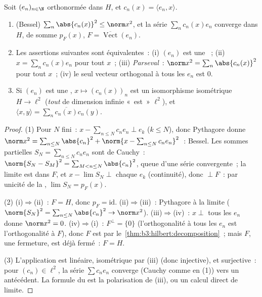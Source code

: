 \begin{theorem}\label{thm:b3:hilbert:parseval}
Soit $(e_n)_{n\in\N}$ orthonormée dans $H$, et $c_n(x) =
\langle e_n, x\rangle$.
\begin{enumerate}
  \item (Bessel) $\sum_n\abs{c_n(x)}^2 \leq \norm x^2$, et
        la série $\sum_nc_n(x)e_n$ converge dans $H$, de
        somme $p_F(x)$, $F = \overline{\operatorname{Vect}}(e_n)$.
  \item Les assertions suivantes sont équivalentes~: (i)
        $(e_n)$ est une ~; (ii) $x =
        \sum_nc_n(x)e_n$ pour tout $x$~; (iii)
        \emph{Parseval}~: $\norm
        x^2 = \sum_n\abs{c_n(x)}^2$ pour tout $x$~; (iv) le
        seul vecteur orthogonal à tous les $e_n$ est $0$.
  \item Si $(e_n)$ est une , $x \mapsto
        (c_n(x))_n$ est un isomorphisme isométrique $H \to
        \ell^2$ (\emph{tout}   de
        dimension infinie «~est~» $\ell^2$), et $\langle x,
        y\rangle = \sum_n\overline{c_n(x)}c_n(y)$.
\end{enumerate}
\end{theorem}

\begin{proof}
(1) Pour $N$ fini~: $x - \sum_{n\leq N}c_ne_n \perp e_k$ ($k
\leq N$), donc Pythagore donne $\norm x^2 = \sum_{n\leq
N}\abs{c_n}^2 + \norm{x - \sum_{n\leq N}c_ne_n}^2$~: Bessel.
Les sommes partielles $S_N = \sum_{n\leq N}c_ne_n$ sont de
Cauchy~: $\norm{S_N - S_M}^2 = \sum_{M<n\leq N}\abs{c_n}^2$,
queue d'une série convergente~; la limite est dans $F$, et $x
- \lim S_N \perp$ chaque $e_k$ (continuité), donc $\perp F$~:
par unicité de la , $\lim S_N =
p_F(x)$.

(2) (i)$\Rightarrow$(ii)~: $F = H$, donc $p_F = \mathrm{id}$.
(ii)$\Rightarrow$(iii)~: Pythagore à la limite ($\norm{S_N}^2
= \sum_{n \leq N}\abs{c_n}^2 \to \norm x^2$).
(iii)$\Rightarrow$(iv)~: $x \perp$ tous les $e_n$ donne
$\norm x^2 = 0$. (iv)$\Rightarrow$(i)~: $F^\perp = \{0\}$
(l'orthogonalité à tous les $e_n$ est l'orthogonalité à $F$),
donc $F$ est  par
le~\cref{thm:b3:hilbert:decomposition}~; mais $F$, une
fermeture, est déjà fermé~: $F = H$.

(3) L'application est linéaire, isométrique par (iii) (donc
injective), et surjective~: pour $(c_n) \in \ell^2$, la série
$\sum c_ne_n$ converge (Cauchy comme en (1)) vers un
antécédent. La formule du  est la polarisation
de (iii), ou un calcul direct de limite.
\end{proof}

